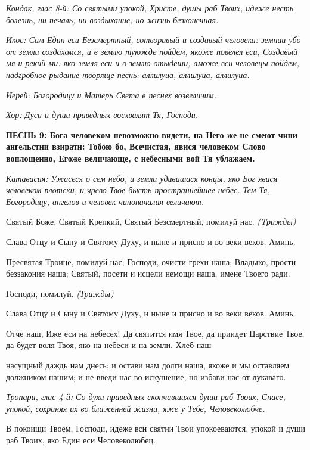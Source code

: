  \itshape Кондак, глас 8-й:\normalfont{} Со святыми упокой, Христе, душы раб Твоих, идеже
несть болезнь, ни печаль, ни воздыхание, но жизнь безконечная.


 \itshape Икос:\normalfont{} Сам Един еси Безсмертный, сотворивый и создавый человека:
земнии убо от земли создахомся, и в землю туюжде пойдем, якоже повелел
еси, Создавый мя и рекий ми: яко земля еси и в землю отыдеши, аможе вси
человецы пойдем, надгробное рыдание творяще песнь: аллилуиа, аллилуиа,
аллилуиа.


 \itshape  Иерей:\normalfont{} Богородицу и Матерь Света в песнех возвеличим.


 \itshape  Хор:\normalfont{} Дуси и души праведных восхвалят Тя, Господи.


 

\bfseries ПЕСНЬ 9:\normalfont{}  Бога человеком невозможно видети, на Него же не смеют
чини ангельстии взирати: Тобою бо, Всечистая, явися человеком Слово
воплощенно, Егоже величающе, с небесными вой Тя ублажаем.


 \itshape Катавасия:\normalfont{} Ужасеся о сем небо, и земли удивишася концы, яко Бог явися
человеком плотски, и чрево Твое бысть пространнейшее небес. Тем Тя,
Богородицу, ангелов и человек чиноначалия величают.


   Святый Боже, Святый Крепкий, Святый Безсмертный, помилуй нас. \itshape 
(Tрижды)\normalfont{}


   Слава Отцу и Сыну и Святому Духу, и ныне и присно и во веки веков.
Аминь.


   Пресвятая Троице, помилуй нас; Господи, очисти грехи наша; Владыко,
прости беззакония наша; Святый, посети и исцели немощи наша, имене
Твоего ради.


   Господи, помилуй. \itshape  (Трижды)\normalfont{}


   Слава Отцу и Сыну и Святому Духу, и ныне и присно и во веки веков.
Аминь.


   Отче наш, Иже еси на небесех! Да святится имя Твое, да приидет
Царствие Твое, да будет воля Твоя, яко на небеси и на земли. Хлеб наш

насущный даждь нам днесь; и остави нам долги наша, якоже и мы оставляем
должником нашим; и не введи нас во искушение, но избави нас от
лукаваго.


 \itshape Тропари, глас 4-й:\normalfont{} Со духи праведных скончавшихся души раб
Твоих, Спасе, упокой, сохраняя их во блаженней жизни, яже у Тебе,
Человеколюбче.


   В покоищи Твоем, Господи, идеже вси святии Твои упокоеваются, упокой
и души раб Твоих, яко Един еси Человеколюбец.


